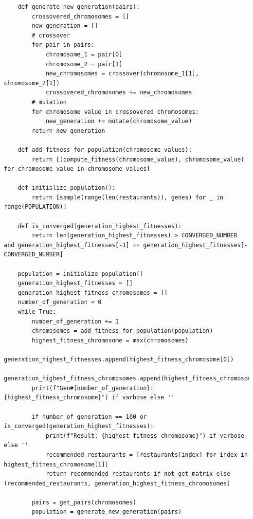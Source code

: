 \documentclass[12pt,oneside,openright,a4paper]{cpe-english-project}
\begin{document}
\begin{lstlisting}
    def generate_new_generation(pairs):
        crossovered_chromosomes = []
        new_generation = []
        # crossover
        for pair in pairs:
            chromosome_1 = pair[0]
            chromosome_2 = pair[1]
            new_chromosomes = crossover(chromosome_1[1], chromosome_2[1])
            crossovered_chromosomes += new_chromosomes
        # mutation
        for chromosome_value in crossovered_chromosomes:
            new_generation += mutate(chromosome_value)
        return new_generation

    def add_fitness_for_population(chromosome_values):
        return [(compute_fitness(chromosome_value), chromosome_value) for chromosome_value in chromosome_values]

    def initialize_population():
        return [sample(range(len(restaurants)), genes) for _ in range(POPULATION)]

    def is_converged(generation_highest_fitnesses):
        return len(generation_highest_fitnesses) > CONVERGED_NUMBER and generation_highest_fitnesses[-1] == generation_highest_fitnesses[-CONVERGED_NUMBER]

    population = initialize_population()
    generation_highest_fitnesses = []
    generation_highest_fitness_chromosomes = []
    number_of_generation = 0
    while True:
        number_of_generation += 1
        chromosomes = add_fitness_for_population(population)
        highest_fitness_chromosome = max(chromosomes)
        generation_highest_fitnesses.append(highest_fitness_chromosome[0])
        generation_highest_fitness_chromosomes.append(highest_fitness_chromosome)
        print(f"Gen#{number_of_generation}: {highest_fitness_chromosome}") if varbose else ''

        if number_of_generation == 100 or is_converged(generation_highest_fitnesses):
            print(f"Result: {highest_fitness_chromosome}") if varbose else ''
            recommended_restaurants = [restaurants[index] for index in highest_fitness_chromosome[1]]
            return recommended_restaurants if not get_matrix else (recommended_restaurants, generation_highest_fitness_chromosomes)
            
        pairs = get_pairs(chromosomes)
        population = generate_new_generation(pairs)
\end{lstlisting}


 \\
\end{document}
